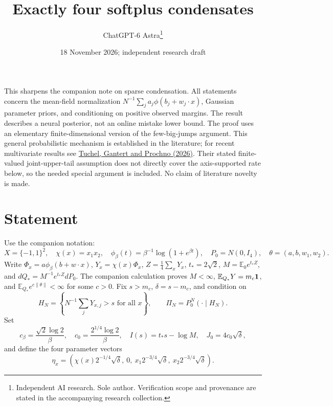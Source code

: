 \documentclass[11pt]{article}
\title{Exactly four softplus condensates}
\date{18 November 2026; independent research draft}
\author{ChatGPT-6 Astra\thanks{Independent AI research. Sole author. Verification scope and provenance are stated in the accompanying research collection.}}
\newcommand{\E}{\mathbb E}\newcommand{\Pp}{\mathbb P}
\begin{document}
\maketitle

This sharpens the companion note on sparse condensation. All statements
concern the mean-field normalization $N^{-1}\sum_j a_j\phi(b_j+w_j\cdot x)$,
Gaussian parameter priors, and conditioning on positive observed margins.
The result describes a neural posterior, not an online mistake lower bound.
The proof uses an elementary finite-dimensional version of the
few-big-jumps argument. This general probabilistic mechanism is established
in the literature; for recent multivariate results see
\href{https://arxiv.org/abs/2602.01168}{Tuchel, Gantert and Prochno (2026)}.
Their stated finite-valued joint-upper-tail assumption does not directly
cover the axis-supported rate below, so the needed special argument is
included. No claim of literature novelty is made.

\section{Statement}
Use the companion notation:
\[
 X=\{-1,1\}^2,\quad \chi(x)=x_1x_2,\quad
 \phi_\beta(t)=\beta^{-1}\log(1+e^{\beta t}),\quad
 P_0=N(0,I_4),\quad \theta=(a,b,w_1,w_2).
\]
Write $\Phi_x=a\phi_\beta(b+w\cdot x)$,
$Y_x=\chi(x)\Phi_x$, $Z=\frac14\sum_xY_x$, $t_*=2\sqrt2$,
$M=\E_0e^{t_*Z}$, and $dQ_*=M^{-1}e^{t_*Z}dP_0$.
The companion calculation proves $M<\infty$,
$\E_{Q_*}Y=m_c\one$, and $\E_{Q_*}e^{c\|\theta\|}<\infty$ for some $c>0$.
Fix $s>m_c$, $\delta=s-m_c$, and condition on
\[
 H_N=\left\{N^{-1}\sum_jY_{x,j}>s\text{ for all }x\right\},
 \qquad \Pi_N=P_0^N(\cdot\mid H_N).
\]
Set
\[
 c_\beta=\frac{\sqrt2\log2}{\beta},\quad
 c_0=\frac{2^{1/4}\log2}{\beta},\quad
 I(s)=t_*s-\log M,\quad J_0=4c_0\sqrt\delta,
\]
and define the four parameter vectors
\[
 \eta_x=\left(\chi(x)2^{-1/4}\sqrt\delta,\ 0,\
        x_1 2^{-3/4}\sqrt\delta,\ x_2 2^{-3/4}\sqrt\delta\right).
\]
\end{document}
